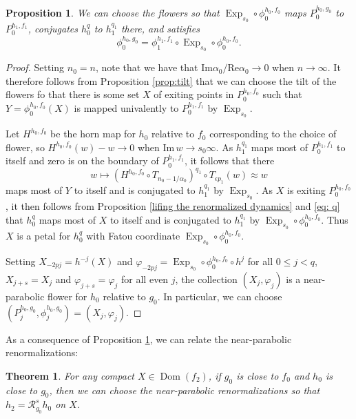 \documentclass[12pt,letterpaper]{amsart}
\numberwithin{equation}{section}
\newtheorem{prop}[equation]{Proposition}
\newtheorem{theorem}[equation]{Theorem}
\theoremstyle{remark}
\theoremstyle{definition}
\newcommand{\RR}{\mathcal R}
\DeclareMathOperator{\Dom}{Dom}
\DeclareMathOperator{\Exp}{Exp}
\begin{document}
	\begin{prop}\label{prop:comparing petals}
		We can choose the flowers  so that $\Exp_{s_0}\circ \phi_0^{h_0, f_0}$ maps $P_0^{h_0, g_0}$ to $P_0^{h_1, f_1}$, conjugates $h_0^q$ to $h_1^{q_1}$ there, and satisfies $$\phi_0^{h_0, g_0} = \phi_1^{h_1, f_1}\circ \Exp_{s_0}\circ \phi_0^{h_0, f_0}.$$
	\end{prop}
	\begin{proof}
		Setting $n_0= n$, note that we have that $\text{Im}\alpha_0/\text{Re}\alpha_0\to 0$ when $n\to \infty$. 
		It therefore follows from Proposition \ref{prop:tilt} that we can choose the tilt of 
		the flowers fo that there is some set $X$ of exiting points in $P_0^{h_0, f_0}$ such that $Y = \phi_0^{h_0, f_0}(X)$ is mapped univalently to $P_0^{h_1, f_1}$ by $\Exp_{s_0}$.
		
		Let $H^{h_0, f_0}$ be the horn map for $h_0$ relative to $f_0$ corresponding to the choice of flower, so $H^{h_0, f_0}(w) - w\to 0$ when $\text{Im}\,w\to s_0\infty$.
		As $h_1^{q_1}$ maps most of $P_{0}^{h_1, f_1}$ to itself and zero is on the boundary of $P_0^{h_1, f_1}$, it follows that there 
		$$w\mapsto(H^{h_0, f_0}\circ T_{n_0-1/\alpha_0})^{q_1}\circ T_{\epsilon p_1}(w) \approx w$$
		maps most of $Y$ to itself and is conjugated to $h_1^{q_1}$ by $\Exp_{s_0}$.
		As $X$ is exiting $P_0^{h_0, f_0}$, it then follows from Proposition \ref{lifing the renormalized dynamics} and \eqref{eq: q} that $h_0^q$ maps most of $X$ to itself and is conjugated to $h_1^{q_1}$ by $\Exp_{s_0}\circ \phi_0^{h_0, f_0}.$
		Thus $X$ is a petal for $h_0^q$ with Fatou coordinate $\Exp_{s_0}\circ \phi_0^{h_0, f_0}$. 
		
		Setting $X_{-2pj}= h^{-j}(X)$ and $\varphi_{-2pj} = \Exp_{s_0}\circ \phi_0^{h_0, f_0}\circ h^j$ for all $0\leq j < q$,  
		$X_{j+s} = X_j$ and $\varphi_{j+s} = \varphi_j$ for all even $j$, the collection $(X_j, \varphi_j)$ is a near-parabolic flower for $h_0$ relative to $g_0$. 
		In particular, we can choose $(P_j^{h_0, g_0}, \phi_j^{h_0, g_0})= (X_j, \varphi_j)$.
	\end{proof}
	
	
	
	As a consequence of Proposition \ref{prop:comparing petals}, we can relate the near-parabolic renormalizations:
	
	\begin{theorem}\label{thm:comparison}
		For any compact $X\in \Dom(f_2)$, if $g_0$ is close to $f_0$ and $h_0$ is close  to $g_0$, then we can choose the  near-parabolic renormalizations so that 
		$h_2= \RR_{g_0}^sh_0$ on $X$.
	\end{theorem}
	
\end{document}
